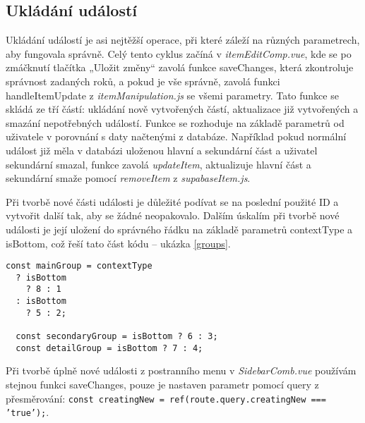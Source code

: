 \subsection{Ukládání událostí}
Ukládání událostí je asi nejtěžší operace, při které záleží na různých parametrech, aby fungovala správně. Celý tento cyklus začíná v \textit{itemEditComp.vue}, kde se po zmáčknutí tlačítka „Uložit změny“ zavolá funkce saveChanges, která zkontroluje správnost zadaných roků, a pokud je vše správně, zavolá funkci handleItemUpdate z \textit{itemManipulation.js} se všemi parametry. Tato funkce se skládá ze tří částí: ukládání nově vytvořených částí, aktualizace již vytvořených a smazání nepotřebných událostí. Funkce se rozhoduje na základě parametrů od uživatele v porovnání s daty načtenými z databáze. Například pokud normální událost již měla v databázi uloženou hlavní a sekundární část a uživatel sekundární smazal, funkce zavolá \textit{updateItem}, aktualizuje hlavní část a sekundární smaže pomocí \textit{removeItem} z \textit{supabaseItem.js}. 

Při tvorbě nové části události je důležité podívat se na poslední použité ID a vytvořit další tak, aby se žádné neopakovalo. Dalším úskalím při tvorbě nové události je její uložení do správného řádku na základě parametrů contextType a isBottom, což řeší tato část kódu – ukázka \ref{groups}.      

\begin{lstlisting}[style=JavaScript, firstnumber = 154, caption={Handle update, itemManipulation.js}, label={groups}]
const mainGroup = contextType
  ? isBottom
    ? 8 : 1
  : isBottom
    ? 5 : 2;

  const secondaryGroup = isBottom ? 6 : 3;
  const detailGroup = isBottom ? 7 : 4;
\end{lstlisting}

Při tvorbě úplně nové události z postranního menu v \textit{SidebarComb.vue} používám stejnou funkci saveChanges, pouze je nastaven parametr pomocí query z přesměrování: \texttt{const creatingNew = ref(route.query.creatingNew === 'true');}.
